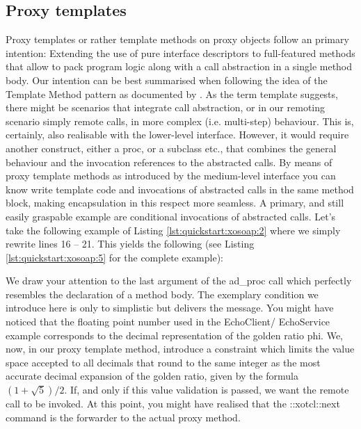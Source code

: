  \subsection{Proxy templates}\label{sec:advanced:template}
Proxy templates or rather template methods on proxy objects follow an primary intention: Extending the 
use of pure interface descriptors to full-featured methods that allow to pack program logic along with a 
call abstraction in a single method body. Our intention can be best summarised when following the idea 
of the Template Method pattern as documented by \cite{gof:1994}. As the term template suggests, there 
might be scenarios that integrate call abstraction, or in our remoting scenario simply remote calls, in 
more complex (i.e. multi-step) behaviour. This is, certainly, also realisable with the lower-level interface. 
However, it would require another construct, either a proc, or a subclass etc., that combines the general 
behaviour and the invocation references to the abstracted calls. By means of proxy template methods as 
introduced by the medium-level interface you can know write template code and invocations of 
abstracted calls in the same method block, making encapsulation in this respect more seamless. A 
primary, and still easily graspable example are conditional invocations of abstracted calls. Let's take the 
following example of Listing \ref{lst:quickstart:xosoap:2} where we simply rewrite lines 16 -- 21. This 
yields the following (see Listing \ref{lst:quickstart:xosoap:5} for the complete example): 



We draw your attention to the last argument of the ad\_proc call which perfectly resembles the 
declaration of a method body. The exemplary condition we introduce here is only to simplistic but 
delivers the message. You might have noticed that the floating point number used in the EchoClient/
EchoService example corresponds to the decimal representation of the golden ratio phi. We, now, in our 
proxy template method, introduce a constraint which limits the value space accepted to all decimals that 
round to the same integer as the most accurate decimal expansion of the golden ratio, given by the 
formula \begin{math} (1 + \sqrt{5}) / 2\end{math}. If, and only if this value validation is passed, we want 
the remote call to be invoked. At this point, you might have realised that the ::xotcl::next command is the 
forwarder to the actual proxy method. 

